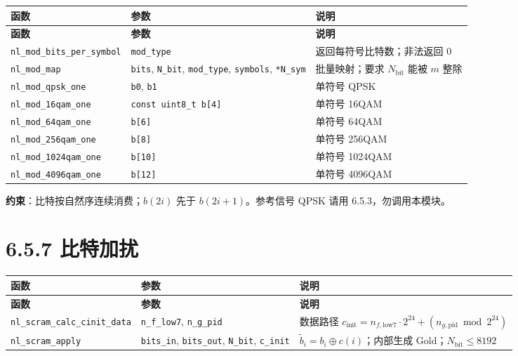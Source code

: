 \documentclass[11pt,a4paper]{ctexart}
\begin{document}
\begin{longtable}{@{}L{4.4cm}L{5.8cm}L{4.3cm}@{}}
\toprule
\textbf{函数} & \textbf{参数} & \textbf{说明} \\
\midrule
\endfirsthead
\toprule\textbf{函数}&\textbf{参数}&\textbf{说明}\\\midrule\endhead
\texttt{nl\_mod\_bits\_per\_symbol}
  & \texttt{mod\_type}
  & 返回每符号比特数；非法返回 0 \\
\texttt{nl\_mod\_map}
  & \texttt{bits}, \texttt{N\_bit}, \texttt{mod\_type}, \texttt{symbols}, \texttt{*N\_sym}
  & 批量映射；要求 $N_{\mathrm{bit}}$ 能被 $m$ 整除 \\
\texttt{nl\_mod\_qpsk\_one}
  & \texttt{b0}, \texttt{b1}
  & 单符号 QPSK \\
\texttt{nl\_mod\_16qam\_one}
  & \texttt{const uint8\_t b[4]}
  & 单符号 16QAM \\
\texttt{nl\_mod\_64qam\_one}
  & \texttt{b[6]}
  & 单符号 64QAM \\
\texttt{nl\_mod\_256qam\_one}
  & \texttt{b[8]}
  & 单符号 256QAM \\
\texttt{nl\_mod\_1024qam\_one}
  & \texttt{b[10]}
  & 单符号 1024QAM \\
\texttt{nl\_mod\_4096qam\_one}
  & \texttt{b[12]}
  & 单符号 4096QAM \\
\bottomrule
\end{longtable}

\textbf{约束}：比特按自然序连续消费；$b(2i)$ 先于 $b(2i{+}1)$。参考信号 QPSK 请用 6.5.3，勿调用本模块。

\newpage
\section{6.5.7 比特加扰}

\begin{longtable}{@{}L{4.6cm}L{5.6cm}L{4.3cm}@{}}
\toprule
\textbf{函数} & \textbf{参数} & \textbf{说明} \\
\midrule
\endfirsthead
\toprule\textbf{函数}&\textbf{参数}&\textbf{说明}\\\midrule\endhead
\texttt{nl\_scram\_calc\_cinit\_data}
  & \texttt{n\_f\_low7}, \texttt{n\_g\_pid}
  & 数据路径 $c_{\mathrm{init}}=n_{f,\mathrm{low7}}\cdot 2^{24}+(n_{g,\mathrm{pid}}\bmod 2^{24})$ \\
\texttt{nl\_scram\_apply}
  & \texttt{bits\_in}, \texttt{bits\_out}, \texttt{N\_bit}, \texttt{c\_init}
  & $\tilde{b}_i = b_i \oplus c(i)$；内部生成 Gold；$N_{\mathrm{bit}}\le 8192$ \\
\bottomrule
\end{longtable}
\end{document}
